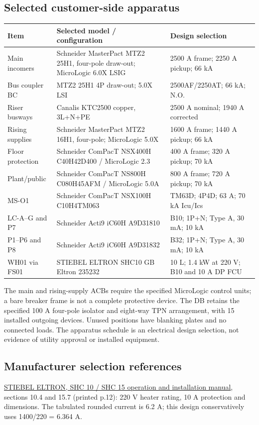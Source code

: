\subsection*{Selected customer-side apparatus}
\begingroup\small\renewcommand{\arraystretch}{1.0}
\begin{longtable}{p{.19\linewidth}p{.42\linewidth}p{.31\linewidth}}\toprule
Item & Selected model / configuration & Design selection\\\midrule\endhead
Main incomers & Schneider MasterPact MTZ2 25H1, four-pole draw-out; MicroLogic 6.0X LSIG & 2500 A frame; 2250 A pickup; 66 kA\\
Bus coupler BC & MTZ2 25H1 4P draw-out; 5.0X LSI & 2500AF/2250AT; 66 kA; N.O.\\
Riser busways & Canalis KTC2500 copper, 3L+N+PE & 2500 A nominal; 1940 A corrected\\
Rising supplies & Schneider MasterPact MTZ2 16H1, four-pole; MicroLogic 5.0X & 1600 A frame; 1440 A pickup; 66 kA\\
Floor protection & Schneider ComPacT NSX400H C40H42D400 / MicroLogic 2.3 & 400 A frame; 320 A pickup; 70 kA\\
Plant/public & Schneider ComPacT NS800H C080H45AFM / MicroLogic 5.0A & 800 A frame; 720 A pickup; 70 kA\\
MS-O1 & Schneider ComPacT NSX100H C10H4TM063 & TM63D; 4P4D; 63 A; 70 kA Icu/Ics\\
LC-A--G and P7 & Schneider Acti9 iC60H A9D31810 & B10; 1P+N; Type A, 30 mA; 10 kA\\
P1--P6 and P8 & Schneider Acti9 iC60H A9D31832 & B32; 1P+N; Type A, 30 mA; 10 kA\\
WH01 via FS01 & STIEBEL ELTRON SHC10 GB Eltron 235232 & 10 L; 1.4 kW at 220 V; B10 and 10 A DP FCU\\
\bottomrule\end{longtable}
\endgroup
The main and rising-supply ACBs require the specified MicroLogic control units; a bare breaker frame is not a complete protective device. The DB retains the specified 100 A four-pole isolator and eight-way TPN arrangement, with 15 installed outgoing devices. Unused positions have blanking plates and no connected loads. The apparatus schedule is an electrical design selection, not evidence of utility approval or installed equipment.

\subsection*{Manufacturer selection references}
\href{https://www.stiebel-eltron.com/content/dam/ste/cdbassets/current/bedienungs-_u_installationsanleitungen/instructionandinstallationmanual_doc-00060782.pdf}{STIEBEL ELTRON, SHC 10 / SHC 15 operation and installation manual}, sections 10.4 and 15.7 (printed p.12): 220 V heater rating, 10 A protection and dimensions. The tabulated rounded current is 6.2 A; this design conservatively uses 1400/220 = 6.364 A.

